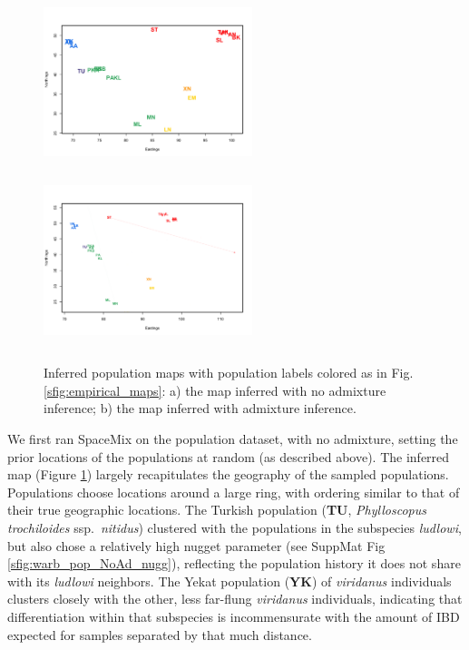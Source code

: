 \documentclass[12pt]{article}
\begin{document}
\begin{figure}
	\centering
			{\includegraphics[width=2.4in,height=2in]{figs/warblers/warb_pop_noad.png}}
			{\includegraphics[width=2.4in,height=2in]{figs/warblers/population_warbler_map_randpr1.png}}
\caption{Inferred population maps with population labels colored as in Fig. \ref{sfig:empirical_maps}: a) the map inferred with no admixture inference; b) the map inferred with admixture inference.}
\label{sfig:warbler_pop}
\end{figure}

We first ran SpaceMix on the population dataset, with no admixture, setting the prior locations of the populations at random (as described above). The inferred map (Figure \ref{sfig:warbler_pop}) largely recapitulates the geography of the sampled populations.  Populations choose locations around a large ring, with ordering similar to that of their true geographic locations.  The Turkish population (\textbf{TU}, \textit{Phylloscopus trochiloides} ssp.\ \textit{nitidus}) clustered with the populations in the subspecies \textit{ludlowi}, but also chose a relatively high nugget parameter (see SuppMat Fig \ref{sfig:warb_pop_NoAd_nugg}), reflecting the population history it does not share with its \textit{ludlowi} neighbors.  The Yekat population (\textbf{YK}) of \textit{viridanus} individuals clusters closely with the other, less far-flung \textit{viridanus} individuals, indicating that differentiation within that subspecies is incommensurate with the amount of IBD expected for samples separated by that much distance. 
\end{document}
